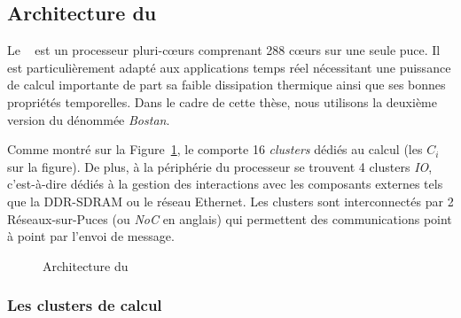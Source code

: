\documentclass[main.tex]{subfiles}
\begin{document}
\subsection{Architecture du \mppalong}

Le \mppalong~\cite{kalray_mppa} est un processeur pluri-c\oe{}urs comprenant 288 c\oe{}urs sur une seule puce. Il est particulièrement adapté aux applications temps réel nécessitant une puissance de calcul importante de part sa faible dissipation thermique ainsi que ses bonnes propriétés temporelles. Dans le cadre de cette thèse, nous utilisons la deuxième version du \mppalong dénommée \emph{Bostan}.

Comme montré sur la Figure~\ref{fig_resumeFr_MPPANoCtopology}, le \mppalong comporte 16 \emph{clusters} dédiés au calcul (les $C_i$ sur la figure). De plus, à la périphérie du processeur se trouvent 4 clusters \emph{IO}, c'est-à-dire dédiés à la gestion des interactions avec les composants externes tels que la DDR-SDRAM ou le réseau Ethernet. Les clusters sont interconnectés par 2 Réseaux-sur-Puces (ou \emph{NoC} en anglais) qui permettent des communications point à point par l'envoi de message.


\begin{figure}
    \centering
    \scalebox{1.5}{}
    \caption{Architecture du \mppalong}
    \label{fig_resumeFr_MPPANoCtopology}
\end{figure} 

\subsubsection{Les clusters de calcul}
\end{document}
